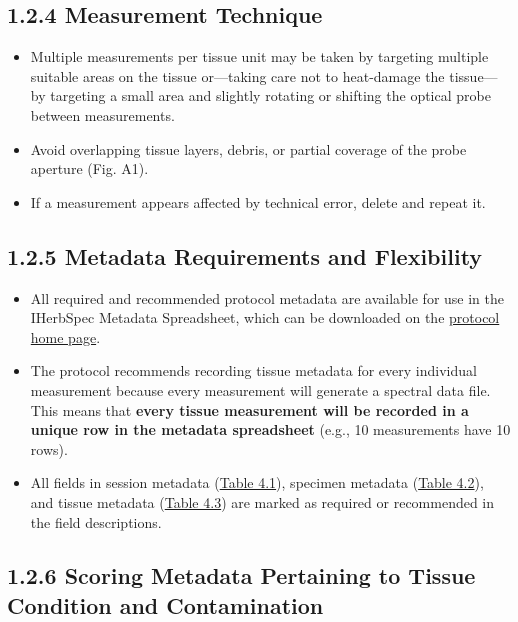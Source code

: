 \documentclass[
  letterpaper,
  DIV=11,
  numbers=noendperiod]{scrreprt}
\providecommand{\tightlist}{%
  \setlength{\itemsep}{0pt}\setlength{\parskip}{0pt}}
\begin{document}
\subsection{1.2.4 Measurement Technique}\label{measurement-technique}

\begin{itemize}
\tightlist
\item
  Multiple measurements per tissue unit may be taken by targeting
  multiple suitable areas on the tissue or---taking care not to
  heat-damage the tissue---by targeting a small area and slightly
  rotating or shifting the optical probe between measurements.\\
\item
  Avoid overlapping tissue layers, debris, or partial coverage of the
  probe aperture (Fig. A1).\\
\item
  If a measurement appears affected by technical error, delete and
  repeat it.
\end{itemize}

\subsection{1.2.5 Metadata Requirements and
Flexibility}\label{metadata-requirements-and-flexibility}

\begin{itemize}
\tightlist
\item
  All required and recommended protocol metadata are available for use
  in the IHerbSpec Metadata Spreadsheet, which can be downloaded on the
  \href{https://iherbspec.github.io/protocol}{protocol home page}.\\
\item
  The protocol recommends recording tissue metadata for every individual
  measurement because every measurement will generate a spectral data
  file. This means that \textbf{every tissue measurement will be
  recorded in a unique row in the metadata spreadsheet} (e.g., 10
  measurements have 10 rows).\\
\item
  All fields in session metadata (\hyperref[tbl-4-1]{Table 4.1}),
  specimen metadata (\hyperref[tbl-4-2]{Table 4.2}), and tissue metadata
  (\hyperref[tbl-4-3]{Table 4.3}) are marked as required or recommended
  in the field descriptions.
\end{itemize}

\subsection{1.2.6 Scoring Metadata Pertaining to Tissue Condition and
Contamination}\label{scoring-metadata-pertaining-to-tissue-condition-and-contamination}
\end{document}
